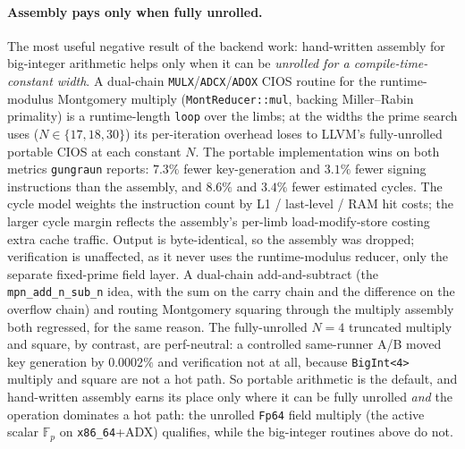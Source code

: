 \paragraph{Assembly pays only when fully unrolled.}
The most useful negative result of the backend work: hand-written
assembly for big-integer arithmetic helps only when it can be
\emph{unrolled for a compile-time-constant width}.  A dual-chain
\texttt{MULX}/\texttt{ADCX}/\texttt{ADOX} CIOS routine for the
runtime-modulus Montgomery multiply (\texttt{MontReducer::mul},
backing Miller--Rabin primality) is a runtime-length \texttt{loop}
over the limbs; at the widths the prime search uses
($N \in \{17,18,30\}$) its per-iteration overhead loses to LLVM's
fully-unrolled portable CIOS at each constant $N$.  The portable
implementation wins on both metrics \texttt{gungraun} reports: $7.3\%$
fewer key-generation and $3.1\%$ fewer signing instructions than the
assembly, and $8.6\%$ and $3.4\%$ fewer estimated cycles.  The cycle
model weights the instruction count by L1 / last-level / RAM hit costs;
the larger cycle margin reflects the assembly's per-limb
load-modify-store costing extra cache traffic.  Output is
byte-identical, so the assembly was dropped; verification is
unaffected, as it never uses the runtime-modulus reducer, only the
separate fixed-prime field layer.  A dual-chain add-and-subtract (the
\texttt{mpn\_add\_n\_sub\_n} idea, with the sum on the carry chain and
the difference on the overflow chain) and routing Montgomery squaring
through the multiply assembly both regressed, for the same reason.  The
fully-unrolled $N{=}4$ truncated multiply and square, by contrast, are
perf-neutral: a controlled same-runner A/B moved key generation by
$0.0002\%$ and verification not at all, because \texttt{BigInt<4>}
multiply and square are not a hot path.  So portable arithmetic is the
default, and hand-written assembly earns its place only where it can be
fully unrolled \emph{and} the operation dominates a hot path: the
unrolled \texttt{Fp64} field multiply (the active scalar $\mathbb{F}_p$
on \texttt{x86\_64}+ADX) qualifies, while the big-integer routines above
do not.

